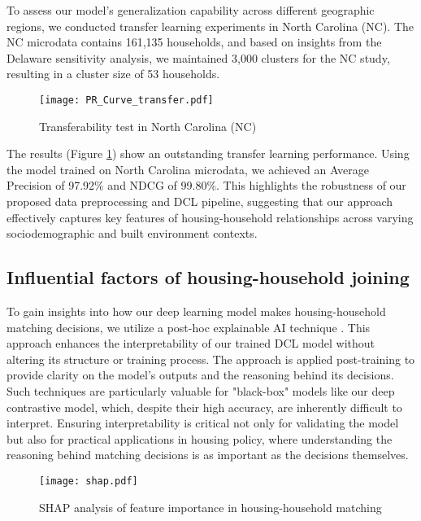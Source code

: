 \documentclass[]{nature_mod}
\begin{document}
To assess our model's generalization capability across different geographic regions, we conducted transfer learning experiments in North Carolina (NC). The NC microdata contains 161,135 households, and based on insights from the Delaware sensitivity analysis, we maintained 3,000 clusters for the NC study, resulting in a cluster size of 53 households.

\begin{figure}[!ht]
  \centering
  \texttt{[image: PR\_Curve\_transfer.pdf]}
  \caption{Transferability test in North Carolina (NC)}
  \label{fig:transferability}
\end{figure}

The results (Figure \ref{fig:transferability}) show an outstanding transfer learning performance. Using the model trained on North Carolina microdata, we achieved an Average Precision of 97.92\% and NDCG of 99.80\%. This highlights the robustness of our proposed data preprocessing and DCL pipeline, suggesting that our approach effectively captures key features of housing-household relationships across varying sociodemographic and built environment contexts.

\subsection{Influential factors of housing-household joining}

To gain insights into how our deep learning model makes housing-household matching decisions, we utilize a post-hoc explainable AI technique \cite{gilpin2018explaining}. This approach enhances the interpretability of our trained DCL model without altering its structure or training process. The approach is applied post-training to provide clarity on the model's outputs and the reasoning behind its decisions. Such techniques are particularly valuable for "black-box" models like our deep contrastive model, which, despite their high accuracy, are inherently difficult to interpret. Ensuring interpretability is critical not only for validating the model but also for practical applications in housing policy, where understanding the reasoning behind matching decisions is as important as the decisions themselves.

\begin{figure}[!ht]
  \centering
  \texttt{[image: shap.pdf]}
  \caption{SHAP analysis of feature importance in housing-household matching}
  \label{fig:shap_summary}
\end{figure}
\end{document}
